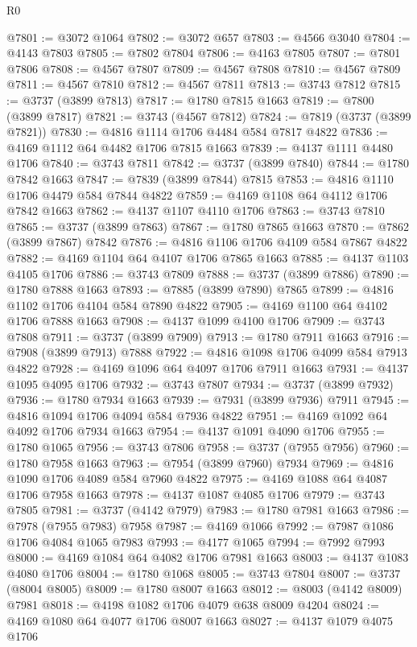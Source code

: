 \begin{lexlean}{R0}
\begin{coremodule}
@7801 := @3072 @1064
@7802 := @3072 @657
@7803 := @4566 @3040
@7804 := @4143 @7803
@7805 := @7802 @7804
@7806 := @4163 @7805
@7807 := @7801 @7806
@7808 := @4567 @7807
@7809 := @4567 @7808
@7810 := @4567 @7809
@7811 := @4567 @7810
@7812 := @4567 @7811
@7813 := @3743 @7812
@7815 := @3737 (@3899 @7813)
@7817 := @1780 @7815 @1663
@7819 := @7800 (@3899 @7817)
@7821 := @3743 (@4567 @7812)
@7824 := @7819 (@3737 (@3899 @7821))
@7830 := @4816 @1114 @1706 @4484 @584 @7817 @4822
@7836 := @4169 @1112 @64 @4482 @1706 @7815 @1663
@7839 := @4137 @1111 @4480 @1706
@7840 := @3743 @7811
@7842 := @3737 (@3899 @7840)
@7844 := @1780 @7842 @1663
@7847 := @7839 (@3899 @7844) @7815
@7853 := @4816 @1110 @1706 @4479 @584 @7844 @4822
@7859 := @4169 @1108 @64 @4112 @1706 @7842 @1663
@7862 := @4137 @1107 @4110 @1706
@7863 := @3743 @7810
@7865 := @3737 (@3899 @7863)
@7867 := @1780 @7865 @1663
@7870 := @7862 (@3899 @7867) @7842
@7876 := @4816 @1106 @1706 @4109 @584 @7867 @4822
@7882 := @4169 @1104 @64 @4107 @1706 @7865 @1663
@7885 := @4137 @1103 @4105 @1706
@7886 := @3743 @7809
@7888 := @3737 (@3899 @7886)
@7890 := @1780 @7888 @1663
@7893 := @7885 (@3899 @7890) @7865
@7899 := @4816 @1102 @1706 @4104 @584 @7890 @4822
@7905 := @4169 @1100 @64 @4102 @1706 @7888 @1663
@7908 := @4137 @1099 @4100 @1706
@7909 := @3743 @7808
@7911 := @3737 (@3899 @7909)
@7913 := @1780 @7911 @1663
@7916 := @7908 (@3899 @7913) @7888
@7922 := @4816 @1098 @1706 @4099 @584 @7913 @4822
@7928 := @4169 @1096 @64 @4097 @1706 @7911 @1663
@7931 := @4137 @1095 @4095 @1706
@7932 := @3743 @7807
@7934 := @3737 (@3899 @7932)
@7936 := @1780 @7934 @1663
@7939 := @7931 (@3899 @7936) @7911
@7945 := @4816 @1094 @1706 @4094 @584 @7936 @4822
@7951 := @4169 @1092 @64 @4092 @1706 @7934 @1663
@7954 := @4137 @1091 @4090 @1706
@7955 := @1780 @1065
@7956 := @3743 @7806
@7958 := @3737 (@7955 @7956)
@7960 := @1780 @7958 @1663
@7963 := @7954 (@3899 @7960) @7934
@7969 := @4816 @1090 @1706 @4089 @584 @7960 @4822
@7975 := @4169 @1088 @64 @4087 @1706 @7958 @1663
@7978 := @4137 @1087 @4085 @1706
@7979 := @3743 @7805
@7981 := @3737 (@4142 @7979)
@7983 := @1780 @7981 @1663
@7986 := @7978 (@7955 @7983) @7958
@7987 := @4169 @1066
@7992 := @7987 @1086 @1706 @4084 @1065 @7983
@7993 := @4177 @1065
@7994 := @7992 @7993
@8000 := @4169 @1084 @64 @4082 @1706 @7981 @1663
@8003 := @4137 @1083 @4080 @1706
@8004 := @1780 @1068
@8005 := @3743 @7804
@8007 := @3737 (@8004 @8005)
@8009 := @1780 @8007 @1663
@8012 := @8003 (@4142 @8009) @7981
@8018 := @4198 @1082 @1706 @4079 @638 @8009 @4204
@8024 := @4169 @1080 @64 @4077 @1706 @8007 @1663
@8027 := @4137 @1079 @4075 @1706

\end{coremodule}
\end{lexlean}

